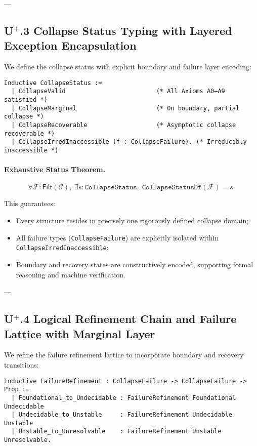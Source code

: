 \documentclass[11pt]{article}
\begin{document}
---

\subsection*{U$^{+}$.3 Collapse Status Typing with Layered Exception Encapsulation}

We define the collapse status with explicit boundary and failure layer encoding:

\begin{lstlisting}[language=Coq]
Inductive CollapseStatus :=
  | CollapseValid                         (* All Axioms A0–A9 satisfied *)
  | CollapseMarginal                      (* On boundary, partial collapse *)
  | CollapseRecoverable                   (* Asymptotic collapse recoverable *)
  | CollapseIrredInaccessible (f : CollapseFailure). (* Irreducibly inaccessible *)
\end{lstlisting}

\paragraph{Exhaustive Status Theorem.}

\[
\forall \mathcal{F} : \mathsf{Filt}(\mathcal{C}),\;
\exists s : \texttt{CollapseStatus},\; \texttt{CollapseStatusOf}(\mathcal{F}) = s.
\]

This guarantees:

\begin{itemize}
    \item Every structure resides in precisely one rigorously defined collapse domain;
    \item All failure types (\texttt{CollapseFailure}) are explicitly isolated within \texttt{CollapseIrredInaccessible};
    \item Boundary and recovery states are constructively encoded, supporting formal reasoning and machine verification.
\end{itemize}

---

\subsection*{U$^{+}$.4 Logical Refinement Chain and Failure Lattice with Marginal Layer}

We refine the failure refinement lattice to incorporate boundary and recovery transitions:

\begin{lstlisting}[language=Coq]
Inductive FailureRefinement : CollapseFailure -> CollapseFailure -> Prop :=
  | Foundational_to_Undecidable : FailureRefinement Foundational Undecidable
  | Undecidable_to_Unstable     : FailureRefinement Undecidable Unstable
  | Unstable_to_Unresolvable    : FailureRefinement Unstable Unresolvable.
\end{lstlisting}
\end{document}
